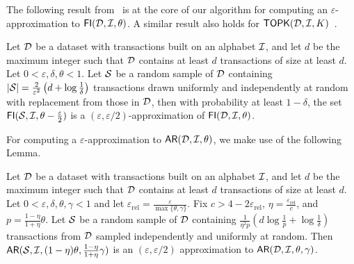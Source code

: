 The following result from~\cite{RiondatoU12} is at the core of our algorithm for
computing an $\varepsilon$-approximation to $\mathsf{FI}({\cal D},{\cal I},\theta)$. A similar
result also holds for $\mathsf{TOPK}({\cal D},{\cal I},K)$~\cite[Lemma 3]{RiondatoU12}.
\begin{lemma}\label{lem:keythmfi}
  \cite[Lemma 1]{RiondatoU12}
   Let ${\cal D}$ be a dataset with transactions built on an alphabet ${\cal I}$, and let
  $d$ be the maximum integer such that ${\cal D}$ contains at least $d$ transactions
  of size at least $d$. Let $0<\varepsilon,\delta,\theta<1$. Let ${\cal S}$ be a random
  sample of ${\cal D}$ containing $|{\cal S}|=
  \frac{2}{\varepsilon^2}\left(d+\log\frac{1}{\delta}\right)$ transactions
  drawn uniformly and independently at random with replacement from those in
  ${\cal D}$, then with probability at least $1-\delta$, the set
  $\mathsf{FI}({\cal S},{\cal I},\theta-\frac{\varepsilon}{2})$ is a
  $(\varepsilon,\varepsilon/2)$-approximation of $\mathsf{FI}({\cal D},{\cal I},\theta)$.
\end{lemma}
For computing a $\varepsilon$-approximation to $\mathsf{AR}({\cal D},{\cal I},\theta)$, we make
use of the following Lemma.
\begin{lemma}\label{lem:keythmar}
 \cite[Lemma 6]{RiondatoU12}
 Let ${\cal D}$ be a dataset with transactions built on an alphabet ${\cal I}$, and let
 $d$ be the maximum integer such that ${\cal D}$ contains at least $d$ transactions
 of size at least $d$. Let $0<\varepsilon,\delta,\theta,\gamma<1$ 
and let $\varepsilon_\mathrm{rel}=\frac{\varepsilon}{\max\{\theta,\gamma\}}$.
Fix $c> 4-2\varepsilon_\mathrm{rel}$, $\eta=\frac{\varepsilon_\mathrm{rel}}{c}$,
and $p=\frac{1-\eta}{1+\eta}\theta$. Let ${\cal S}$ be a random sample of ${\cal D}$
containing $\frac{1}{\eta^2p}(d\log\frac{1}{p}+\log\frac{1}{\delta})$
transactions from ${\cal D}$ sampled independently and uniformly at random. Then
$\mathsf{AR}({\cal S},{\cal I},(1-\eta)\theta,\frac{1-\eta}{1+\eta}\gamma)$ is an
$(\varepsilon,\varepsilon/2)$ approximation to $\mathsf{AR}({\cal D},{\cal I},\theta,\gamma)$.
\end{lemma}

